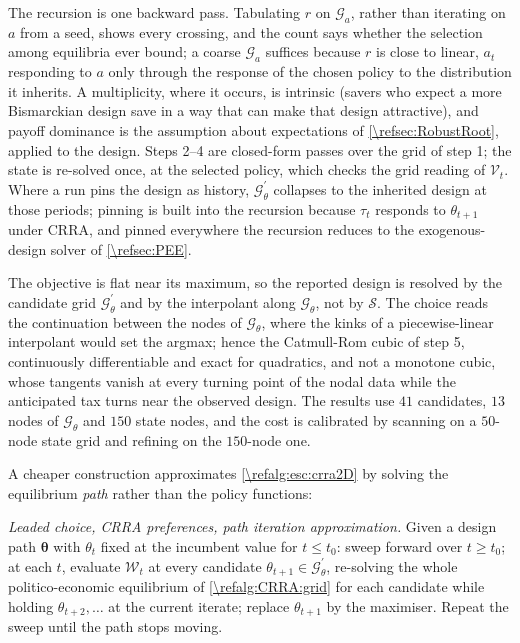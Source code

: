 The recursion is one backward pass. Tabulating $r$ on $\mathcal{G}_{a}$, rather than iterating on $a$ from a seed, shows every crossing, and the count says whether the selection among equilibria ever bound; a coarse $\mathcal{G}_{a}$ suffices because $r$ is close to linear, $a_t$ responding to $a$ only through the response of the chosen policy to the distribution it inherits. A multiplicity, where it occurs, is intrinsic (savers who expect a more Bismarckian design save in a way that can make that design attractive), and payoff dominance is the assumption about expectations of \cref{\refsec:RobustRoot}, applied to the design. Steps 2--4 are closed-form passes over the grid of step 1; the state is re-solved once, at the selected policy, which checks the grid reading of $\mathcal{V}_t$. Where a run pins the design as history, $\mathcal{G}_{\theta}^{\prime}$ collapses to the inherited design at those periods; pinning is built into the recursion because $\tau_t$ responds to $\theta_{t+1}$ under CRRA, and pinned everywhere the recursion reduces to the exogenous-design solver of \cref{\refsec:PEE}.

The objective is flat near its maximum, so the reported design is resolved by the candidate grid $\mathcal{G}_{\theta}^{\prime}$ and by the interpolant along $\mathcal{G}_{\theta}$, not by $\mathcal{S}$. The choice reads the continuation between the nodes of $\mathcal{G}_{\theta}$, where the kinks of a piecewise-linear interpolant would set the argmax; hence the Catmull-Rom cubic of step 5, continuously differentiable and exact for quadratics, and not a monotone cubic, whose tangents vanish at every turning point of the nodal data while the anticipated tax turns near the observed design. The results use $41$ candidates, $13$ nodes of $\mathcal{G}_{\theta}$ and $150$ state nodes, and the cost is calibrated by scanning on a $50$-node state grid and refining on the $150$-node one.

 A cheaper construction approximates \cref{\refalg:esc:crra2D} by solving the equilibrium \emph{path} rather than the policy functions:

\begin{alg}\label{\refalg:esc:crraPath}
\emph{Leaded choice, CRRA preferences, path iteration approximation.} Given a design path $\bm{\theta}$ with $\theta_t$ fixed at the incumbent value for $t\leq t_0$: sweep forward over $t \geq t_0$; at each $t$, evaluate $\mathcal{W}_t$ at every candidate $\theta_{t+1}\in\mathcal{G}_{\theta}^{\prime}$, re-solving the whole politico-economic equilibrium of \cref{\refalg:CRRA:grid} for each candidate while holding $\theta_{t+2},\dots$ at the current iterate; replace $\theta_{t+1}$ by the maximiser. Repeat the sweep until the path stops moving.
\end{alg}

